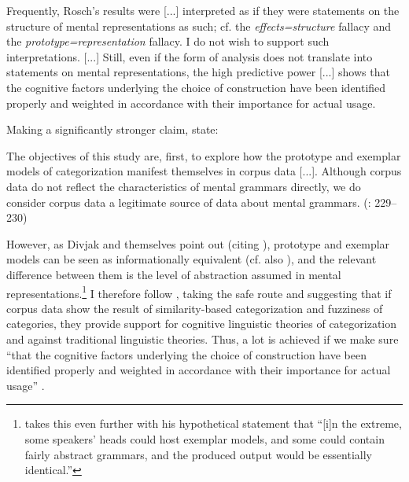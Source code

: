 \begin{styleMoutonQuote}
Frequently, Rosch’s results were [...] interpreted as if they were statements on the structure of mental representations as such; cf. the \textit{effects=structure} fallacy and the \textit{prototype=representation} fallacy. I do not wish to support such interpretations. [...] Still, even if the form of analysis does not translate into statements on mental representations, the high predictive power [...] shows that the cognitive factors underlying the choice of construction have been identified properly and weighted in accordance with their importance for actual usage. \citep[22]{Gries2003}
\end{styleMoutonQuote}

\begin{styleMoutonText}
Making a significantly stronger claim, \citet{DivjakArppe2013} state:
\end{styleMoutonText}

\begin{styleMoutonQuote}
The objectives of this study are, first, to explore how the prototype and exemplar models of categorization manifest themselves in corpus data [...]. Although corpus data do not reflect the characteristics of mental grammars directly, we do consider corpus data a legitimate source of data about mental grammars. (\citealt{DivjakArppe2013}: 229–230)
\end{styleMoutonQuote}

\begin{styleMoutonText}
However, as Divjak and \citet[224]{Arppe2013} themselves point out (citing \citealt{Barsalou1990}), prototype and exemplar models can be seen as informationally equivalent (cf. also ), and the relevant difference between them is the level of abstraction assumed in mental representations.\footnote{\citet[15]{Kapatsinksi2014} takes this even further with his hypothetical statement that “[i]n the extreme, some speakers’ heads could host exemplar models, and some could contain fairly abstract grammars, and the produced output would be essentially identical.”} I therefore follow \citet{Gries2003}, taking the safe route and suggesting that if corpus data show the result of similarity-based categorization and fuzziness of categories, they provide support for cognitive linguistic theories of categorization and against traditional linguistic theories. Thus, a lot is achieved if we make sure “that the cognitive factors underlying the choice of construction have been identified properly and weighted in accordance with their importance for actual usage” \citep[22]{Gries2003}.
\end{styleMoutonText}

